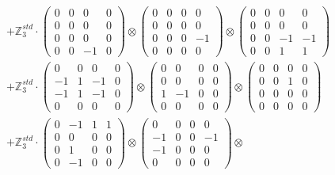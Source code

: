 \documentclass{article}
\begin{document}
{\begin{align}
        &+ \label{Rs16-Rc11-Solution-31-c22} \mathbb{Z}_3^{std} \cdot 
            \begin{pmatrix} 0 & 0 & 0 & 0 \\ 0 & 0 & 0 & 0 \\ 0 & 0 & 0 & 0 \\ 0 & 0 & -1 & 0 \end{pmatrix} \otimes 
            \begin{pmatrix} 0 & 0 & 0 & 0 \\ 0 & 0 & 0 & 0 \\ 0 & 0 & 0 & -1 \\ 0 & 0 & 0 & 0 \end{pmatrix} \otimes 
            \begin{pmatrix} 0 & 0 & 0 & 0 \\ 0 & 0 & 0 & 0 \\ 0 & 0 & -1 & -1 \\ 0 & 0 & 1 & 1 \end{pmatrix} \\ 
        &+ \label{Rs16-Rc11-Solution-31-c23} \mathbb{Z}_3^{std} \cdot 
            \begin{pmatrix} 0 & 0 & 0 & 0 \\ -1 & 1 & -1 & 0 \\ -1 & 1 & -1 & 0 \\ 0 & 0 & 0 & 0 \end{pmatrix} \otimes 
            \begin{pmatrix} 0 & 0 & 0 & 0 \\ 0 & 0 & 0 & 0 \\ 1 & -1 & 0 & 0 \\ 0 & 0 & 0 & 0 \end{pmatrix} \otimes 
            \begin{pmatrix} 0 & 0 & 0 & 0 \\ 0 & 0 & 1 & 0 \\ 0 & 0 & 0 & 0 \\ 0 & 0 & 0 & 0 \end{pmatrix} \\ 
        &+ \label{Rs16-Rc11-Solution-31-c24} \mathbb{Z}_3^{std} \cdot 
            \begin{pmatrix} 0 & -1 & 1 & 1 \\ 0 & 0 & 0 & 0 \\ 0 & 1 & 0 & 0 \\ 0 & -1 & 0 & 0 \end{pmatrix} \otimes 
            \begin{pmatrix} 0 & 0 & 0 & 0 \\ -1 & 0 & 0 & -1 \\ -1 & 0 & 0 & 0 \\ 0 & 0 & 0 & 0 \end{pmatrix} \otimes 

\end{align}}
\end{document}
